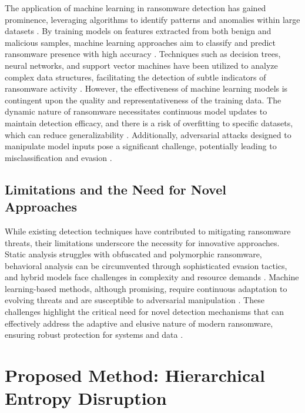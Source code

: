 \documentclass[lettersize,journal]{IEEEtran}
\begin{document}
The application of machine learning in ransomware detection has gained prominence, leveraging algorithms to identify patterns and anomalies within large datasets \cite{gong2024ransomware,zhong2024ransomware}. By training models on features extracted from both benign and malicious samples, machine learning approaches aim to classify and predict ransomware presence with high accuracy \cite{mcintosh2024ransomware}. Techniques such as decision trees, neural networks, and support vector machines have been utilized to analyze complex data structures, facilitating the detection of subtle indicators of ransomware activity \cite{li2024anomaly, williams2024entropy}. However, the effectiveness of machine learning models is contingent upon the quality and representativeness of the training data. The dynamic nature of ransomware necessitates continuous model updates to maintain detection efficacy, and there is a risk of overfitting to specific datasets, which can reduce generalizability \cite{liu2023mitigating, baston2024hierarchical}. Additionally, adversarial attacks designed to manipulate model inputs pose a significant challenge, potentially leading to misclassification and evasion \cite{chen2024detecting, long2024ranaway}.

\subsection{Limitations and the Need for Novel Approaches}

While existing detection techniques have contributed to mitigating ransomware threats, their limitations underscore the necessity for innovative approaches. Static analysis struggles with obfuscated and polymorphic ransomware, behavioral analysis can be circumvented through sophisticated evasion tactics, and hybrid models face challenges in complexity and resource demands \cite{abutu2024deepcodelock}. Machine learning-based methods, although promising, require continuous adaptation to evolving threats and are susceptible to adversarial manipulation \cite{whitrock2024novel, algarica2024introducing}. These challenges highlight the critical need for novel detection mechanisms that can effectively address the adaptive and elusive nature of modern ransomware, ensuring robust protection for systems and data \cite{kang2023survey}.


\section{Proposed Method: Hierarchical Entropy Disruption}
\end{document}
